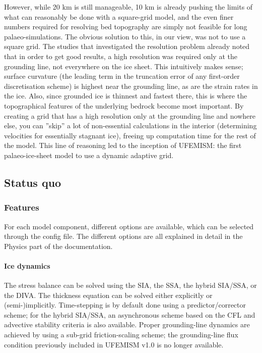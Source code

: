 \documentclass{article}
\begin{document}
However, while 20 km is still manageable, 10 km is already pushing the limits of what can reasonably be done with a square-grid model, and the even finer numbers required for resolving bed topography are simply not feasible for long palaeo-simulations. The obvious solution to this, in our view, was not to use a square grid. The studies that investigated the resolution problem already noted that in order to get good results, a high resolution was required only at the grounding line, not everywhere on the ice sheet. This intuitively makes sense; surface curvature (the leading term in the truncation error of any first-order discretisation scheme) is highest near the grounding line, as are the strain rates in the ice. Also, since grounded ice is thinnest and fastest there, this is where the topographical features of the underlying bedrock become most important. By creating a grid that has a high resolution only at the grounding line and nowhere else, you can ''skip'' a lot of non-essential calculations in the interior (determining velocities for essentially stagnant ice), freeing up computation time for the rest of the model. This line of reasoning led to the inception of UFEMISM: the first palaeo-ice-sheet model to use a dynamic adaptive grid.

\newpage
\subsection{Status quo}

\subsubsection{Features}

For each model component, different options are available, which can be selected through the config file. The different options are all explained in detail in the Physics part of the documentation.

\paragraph{Ice dynamics}
The stress balance can be solved using the SIA, the SSA, the hybrid SIA/SSA, or the DIVA. The thickness equation can be solved either explicitly or (semi-)implicitly. Time-stepping is by default done using a predictor/corrector scheme; for the hybrid SIA/SSA, an asynchronous scheme based on the CFL and advective stability criteria is also available. Proper grounding-line dynamics are achieved by using a sub-grid friction-scaling scheme; the grounding-line flux condition previously included in UFEMISM v1.0 is no longer available.
\end{document}
